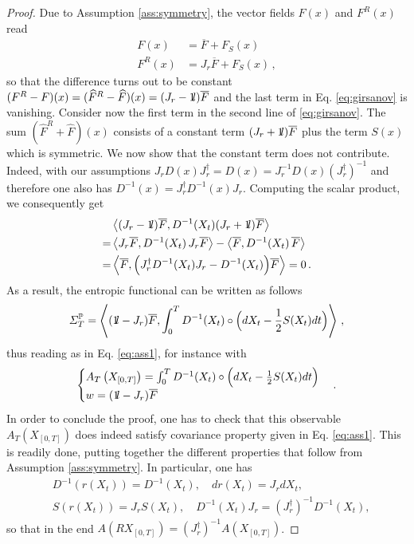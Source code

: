 \documentclass[10pt,a4paper]{amsart}
\newcommand{\bbbone}{\mathchoice {\rm 1\mskip-4mu l} {\rm 1\mskip-4mu l}
{\rm 1\mskip-4.5mu l} {\rm 1\mskip-5mu l}}
\begin{document}
\begin{proof}
    Due to Assumption \ref{ass:symmetry}, the vector fields $F(x)$ and $F^R(x)$ read
    \begin{align*}
        F(x) &= \overline{F} + F_S(x)  \\
        F^R(x) &= J_r \overline{F} + F_S(x) \,,
    \end{align*}
    so that the difference turns out to be constant $(F^R- F)(x)= (\widehat{F}^R- \widehat{F})(x)= (J_r - \bbbone)\overline{F}$
    and the last term in Eq. \eqref{eq:girsanov} is vanishing. Consider now the first term in the second line of \eqref{eq:girsanov}. The sum $(\widehat{F}^R+\widehat{F})(x)$ consists of a constant term $(J_r + \bbbone)\overline{F}$ plus the term $S(x)$ which is symmetric.
    We now show that the constant term does not contribute. Indeed, with our assumptions $J_r D (x) J_r^\dag =D(x) = J_r^{-1} D (x) (J_r^\dag)^{-1}$ and therefore one also has $D^{-1}(x)=  J_r^\dag D^{-1}(x) J_r$. Computing the scalar product, we consequently get
    \begin{align*}
       &\left\langle  (J_r - \bbbone)\overline{F} ,D^{-1}(X_{t}) (J_r + \bbbone)\overline{F} \right\rangle \\
       =& \left\langle  J_r \overline{F} ,D^{-1}(X_{t}) \, J_r  \overline{F} \right\rangle  - \left\langle  \overline{F} , D^{-1}(X_{t})  \,\overline{F} \right\rangle \\
       =& \left\langle  \overline{F} , \Big( J_r^\dag D^{-1}(X_{t}) J_r -  D^{-1}(X_{t}) \Big)\overline{F} \right\rangle = 0 \,.
    \end{align*}
    As a result, the entropic functional can be written as follows
    \begin{equation*}
       \varSigma_{T}^{\mathbb{P}}=  \left\langle (\bbbone -J_r) \overline{F}, \int_{0}^{T}  D^{-1}(X_{t})\circ \Big(dX_{t} - \frac{1}{2} S(X_t) dt \Big) \right\rangle \,,
       \label{eq:GenStefano}
    \end{equation*}
    thus reading as in Eq. \eqref{eq:ass1}, for instance with 
    $$\begin{cases}
     A_T\left(X_{\left[0,T\right]}\right)=\int_{0}^{T}  D^{-1}(X_{t})\circ \Big(dX_{t} - \frac{1}{2} S(X_t) dt \Big) \\
     w= (\bbbone -J_r) \overline{F} 
    \end{cases}.$$ 
    In order to conclude the proof, one has to check that this observable $A_T\left(X_{\left[0,T\right]}\right)$ does indeed satisfy covariance property given in Eq. \eqref{eq:ass1}. This is readily done, putting together the different properties that follow from Assumption \ref{ass:symmetry}. In particular, one has
    \begin{align*}
        &D^{-1}(r(X_t))= D^{-1}(X_t), \quad  d r(X_t)= J_r dX_t, \\
        &S(r(X_t))= J_r S(X_t),\quad  D^{-1}(X_t) J_r= (J_r^\dag)^{-1} D^{-1}(X_t) ,
    \end{align*}
    so that in the end $A\left(R X_{\left[0,T\right]}\right)= (J_r^\dag)^{-1} A\left(X_{\left[0,T\right]}\right)$.    
\end{proof}
\end{document}
